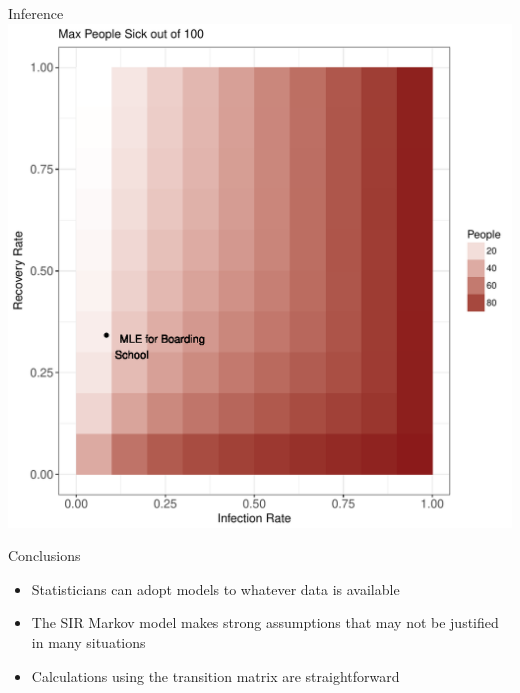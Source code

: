 \documentclass[10pt,table]{beamer}
\begin{document}
\begin{frame}{Inference}
\centering
\includegraphics[scale=.45]{MaxGrid.pdf}
\end{frame}
\begin{frame}{Conclusions}
\begin{itemize}
\item Statisticians can adopt models to whatever data is available
\item The SIR Markov model makes strong assumptions that may not be justified in many situations
\item Calculations using the transition matrix are straightforward
\end{itemize}
\end{frame}
\end{document}
